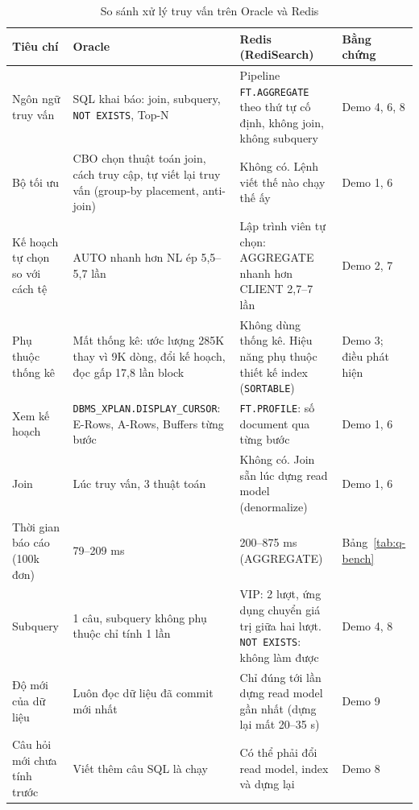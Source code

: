 \begin{table}[H]
\centering
\caption{So sánh xử lý truy vấn trên Oracle và Redis}\label{tab:q-criteria}
\small
\begin{tabularx}{\linewidth}{@{}>{\raggedright\arraybackslash}p{2.6cm}XX>{\raggedright\arraybackslash}p{1.8cm}@{}}
\toprule
Tiêu chí & Oracle & Redis (RediSearch) & Bằng chứng \\
\midrule
Ngôn ngữ truy vấn & SQL khai báo: join, subquery, \texttt{NOT EXISTS}, Top-N & Pipeline \texttt{FT.AGGREGATE} theo thứ tự cố định, không join, không subquery & Demo 4, 6, 8 \\
Bộ tối ưu & CBO chọn thuật toán join, cách truy cập, tự viết lại truy vấn (group-by placement, anti-join) & Không có. Lệnh viết thế nào chạy thế ấy & Demo 1, 6 \\
Kế hoạch tự chọn so với cách tệ & AUTO nhanh hơn NL ép 5,5--5,7 lần & Lập trình viên tự chọn: AGGREGATE nhanh hơn CLIENT 2,7--7 lần & Demo 2, 7 \\
Phụ thuộc thống kê & Mất thống kê: ước lượng 285K thay vì 9K dòng, đổi kế hoạch, đọc gấp 17,8 lần block & Không dùng thống kê. Hiệu năng phụ thuộc thiết kế index (\texttt{SORTABLE}) & Demo 3; điều phát hiện \\
Xem kế hoạch & \texttt{DBMS\_XPLAN.DISPLAY\_CURSOR}: E-Rows, A-Rows, Buffers từng bước & \texttt{FT.PROFILE}: số document qua từng bước & Demo 1, 6 \\
Join & Lúc truy vấn, 3 thuật toán & Không có. Join sẵn lúc dựng read model (denormalize) & Demo 1, 6 \\
Thời gian báo cáo (100k đơn) & 79--209 ms & 200--875 ms (AGGREGATE) & Bảng~\ref{tab:q-bench} \\
Subquery & 1 câu, subquery không phụ thuộc chỉ tính 1 lần & VIP: 2 lượt, ứng dụng chuyển giá trị giữa hai lượt. \texttt{NOT EXISTS}: không làm được & Demo 4, 8 \\
Độ mới của dữ liệu & Luôn đọc dữ liệu đã commit mới nhất & Chỉ đúng tới lần dựng read model gần nhất (dựng lại mất 20--35 s) & Demo 9 \\
Câu hỏi mới chưa tính trước & Viết thêm câu SQL là chạy & Có thể phải đổi read model, index và dựng lại & Demo 8 \\
\bottomrule
\end{tabularx}
\end{table}

